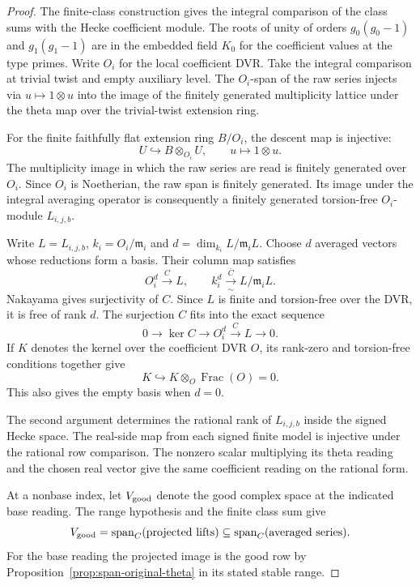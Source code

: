 \begin{proof}
The
finite-class construction gives the integral comparison of the
class sums with the Hecke coefficient module. The roots of
unity of orders \(g_0(g_0-1)\) and \(g_1(g_1-1)\) are in the
embedded field \(K_0\) for the coefficient values at the type
primes. Write \(O_i\) for the local coefficient DVR. Take the
integral comparison at trivial twist and empty auxiliary level.
The \(O_i\)-span of the raw series injects via \(u\mapsto 1\otimes u\)
into the image of the finitely generated multiplicity lattice under
the theta map over the trivial-twist extension ring.

For the finite faithfully flat extension ring \(B/O_i\), the descent map is injective:
\[
 U\hookrightarrow B\otimes_{O_i}U,\qquad u\longmapsto1\otimes u .
\]
The multiplicity image in which the raw series are read is finitely generated over \(O_i\). Since \(O_i\) is
Noetherian, the raw span is finitely generated. Its image under
the integral averaging operator is consequently a finitely generated
torsion-free \(O_i\)-module \(L_{i,j,b}\).

Write \(L=L_{i,j,b}\), \(k_i=O_i/\mathfrak m_i\) and
\(d=\dim_{k_i} L/\mathfrak m_iL\). Choose \(d\) averaged vectors
whose reductions form a basis. Their column map satisfies
\[
 O_i^d\xrightarrow{\,C\,}L,\qquad
 k_i^d\xrightarrow[\sim]{\,\bar C\,}L/\mathfrak m_iL .
\]
Nakayama gives surjectivity of \(C\). Since \(L\) is finite and torsion-free over the DVR, it is free of
rank \(d\). The surjection \(C\) fits into the exact sequence
\[
       0\longrightarrow \ker C\longrightarrow O_i^d
              \xrightarrow{C} L\longrightarrow0 .
\]
If \(K\) denotes the kernel over the coefficient DVR \(O\), its rank-zero and torsion-free conditions together give
\[
 K\hookrightarrow K\otimes_O\operatorname{Frac}(O)=0 .
\]
This also gives the empty basis when \(d=0\).

The second argument determines the rational rank of \(L_{i,j,b}\)
inside the signed Hecke space. The real-side map from each signed
finite model is injective under the rational row comparison.
The nonzero scalar multiplying its theta reading and the chosen
real vector give the same coefficient reading on the rational
form.

At a nonbase index, let \(V_{\rm good}\) denote the good complex space at the indicated base reading. The range hypothesis and the finite class sum give 
\[
 V_{\rm good}=\operatorname{span}_{\mathbb C}(\text{projected lifts})\subseteq\operatorname{span}_{\mathbb C}(\text{averaged series}).
\]
 For the base reading the projected image is the good row by Proposition~\ref{prop:span-original-theta} in its stated stable range. 


\end{proof}
